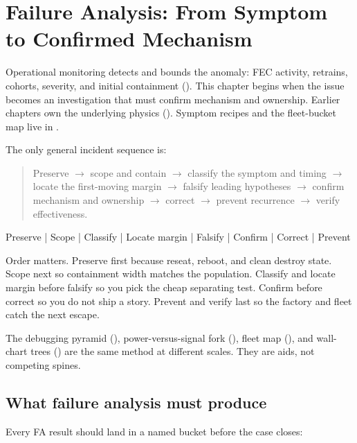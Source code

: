 \chapter{Failure Analysis: From Symptom to Confirmed Mechanism}
\label{ch:failure-modes}

Operational monitoring detects and bounds the anomaly: FEC activity, retrains,
cohorts, severity, and initial containment
(). This chapter begins when the issue
becomes an investigation that must confirm mechanism and ownership. Earlier
chapters own the underlying physics (). Symptom
recipes and the fleet-bucket map live in
.

The only general incident sequence is:

\begin{quote}
\noindent Preserve
$\rightarrow$ scope and contain
$\rightarrow$ classify the symptom and timing
$\rightarrow$ locate the first-moving margin
$\rightarrow$ falsify leading hypotheses
$\rightarrow$ confirm mechanism and ownership
$\rightarrow$ correct
$\rightarrow$ prevent recurrence
$\rightarrow$ verify effectiveness.
\end{quote}

\begin{dectree}
Preserve
  |
Scope
  |
Classify
  |
Locate margin
  |
Falsify
  |
Confirm
  |
Correct
  |
Prevent
\end{dectree}

Order matters. Preserve first because reseat, reboot, and clean destroy state.
Scope next so containment width matches the population. Classify and locate
margin before falsify so you pick the cheap separating test. Confirm before
correct so you do not ship a story. Prevent and verify last so the factory and
fleet catch the next escape.

The debugging pyramid (), power-versus-signal fork
(), fleet map
(), and wall-chart trees () are
the same method at different scales. They are aids, not competing spines.

\section{What failure analysis must produce}
\label{sec:fa-output-categories}

Every FA result should land in a named bucket before the case closes:

